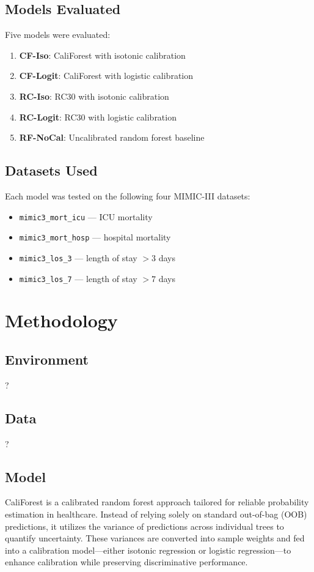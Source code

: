 \documentclass{article}
\begin{document}
\subsection*{Models Evaluated}
Five models were evaluated:
\begin{enumerate}
  \item \textbf{CF-Iso}: CaliForest with isotonic calibration
  \item \textbf{CF-Logit}: CaliForest with logistic calibration
  \item \textbf{RC-Iso}: RC30 with isotonic calibration
  \item \textbf{RC-Logit}: RC30 with logistic calibration
  \item \textbf{RF-NoCal}: Uncalibrated random forest baseline
\end{enumerate}

\subsection*{Datasets Used}
Each model was tested on the following four MIMIC-III datasets:
\begin{itemize}
  \item \texttt{mimic3\_mort\_icu} — ICU mortality
  \item \texttt{mimic3\_mort\_hosp} — hospital mortality
  \item \texttt{mimic3\_los\_3} — length of stay $> 3$ days
  \item \texttt{mimic3\_los\_7} — length of stay $> 7$ days
\end{itemize}

\section{Methodology}

\subsection*{Environment}
?
\subsection*{Data}
?

\subsection*{Model}
CaliForest is a calibrated random forest approach tailored for reliable probability estimation in healthcare. Instead of relying solely on standard out-of-bag (OOB) predictions, it utilizes the variance of predictions across individual trees to quantify uncertainty. These variances are converted into sample weights and fed into a calibration model—either isotonic regression or logistic regression—to enhance calibration while preserving discriminative performance.
\end{document}
